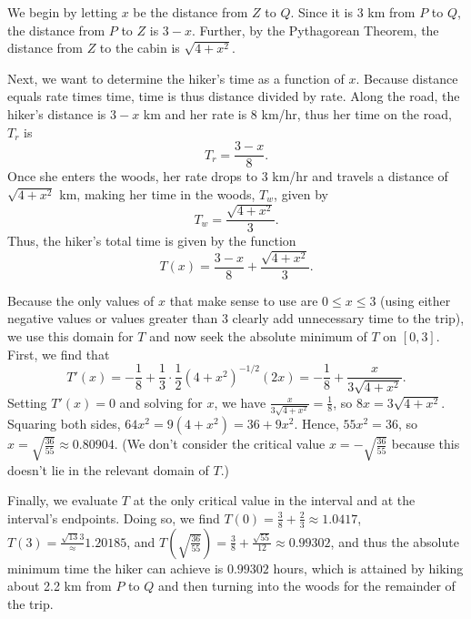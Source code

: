 \begin{activitySolution}
We begin by letting $x$ be the distance from $Z$ to $Q$.  Since it is 3 km from $P$ to $Q$, the distance from $P$ to $Z$ is $3-x$.  Further, by the Pythagorean Theorem, the distance from $Z$ to the cabin is $\sqrt{4+x^2}$.

Next, we want to determine the hiker's time as a function of $x$.  Because distance equals rate times time, time is thus distance divided by rate.  Along the road, the hiker's distance is $3-x$ km and her rate is $8$ km/hr, thus her time on the road, $T_r$ is
$$T_r = \frac{3-x}{8}.$$
Once she enters the woods, her rate drops to $3$ km/hr and travels a distance of $\sqrt{4+x^2}$ km, making her time in the woods, $T_w$, given by
$$T_w = \frac{\sqrt{4+x^2}}{3}.$$
Thus, the hiker's total time is given by the function
$$T(x) = \frac{3-x}{8} + \frac{\sqrt{4+x^2}}{3}.$$

Because the only values of $x$ that make sense to use are $0 \le x \le 3$ (using either negative values or values greater than 3 clearly add unnecessary time to the trip), we use this domain for $T$ and now seek the absolute minimum of $T$ on $[0,3]$.  First, we find that
$$T'(x) = -\frac{1}{8} + \frac{1}{3} \cdot \frac{1}{2} (4+x^2)^{-1/2} (2x) = -\frac{1}{8} + \frac{x}{3\sqrt{4+x^2}}.$$
Setting $T'(x) = 0$ and solving for $x$, we have $\frac{x}{3\sqrt{4+x^2}} = \frac{1}{8}$, so $8x = 3\sqrt{4+x^2}$.  Squaring both sides, $64x^2 = 9(4+x^2) = 36 + 9x^2$.  Hence, $55x^2 = 36$, so $x = \sqrt{\frac{36}{55}} \approx 0.80904$.  (We don't consider the critical value $x = -\sqrt{\frac{36}{55}}$ because this doesn't lie in the relevant domain of $T$.)

Finally, we evaluate $T$ at the only critical value in the interval and at the interval's endpoints.  Doing so, we find $T(0) = \frac{3}{8} + \frac{2}{3} \approx 1.0417$, $T(3) = \frac{\sqrt{13}{3}} \approx 1.20185$, and $T(\sqrt{\frac{36}{55}}) = \frac{3}{8} + \frac{\sqrt{55}}{12} \approx 0.99302$, and thus the absolute minimum time the hiker can achieve is $0.99302$ hours, which is attained by hiking about 2.2 km from $P$ to $Q$ and then turning into the woods for the remainder of the trip.
\end{activitySolution}
\aftera